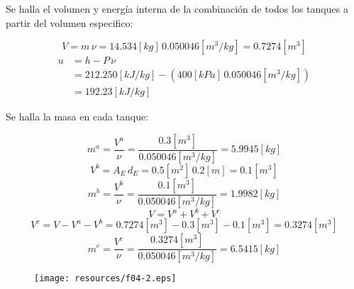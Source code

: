 \documentclass[letter,11pt]{article}
\begin{document}
\begin{enumerate}
Se halla el volumen y energía interna de la combinación de todos los tanques
a partir del volumen especifico:

\begin{equation*}
    V = m\,\nu = 14.534[kg]\,0.050046[m^3/kg] = 0.7274[m^3]
\end{equation*}
\begin{equation*}
    \begin{split}
        u &= h - P\,\nu \\
          &= 212.250[kJ/kg] - (400[kPa]\,0.050046[m^3/kg]) \\
          &= 192.23[kJ/kg]
    \end{split}
\end{equation*}

Se halla la masa en cada tanque:

\begin{equation*}
    m^a = \frac{V^a}{\nu} = \frac{0.3[m^3]}{0.050046[m^3/kg]} = 5.9945[kg]
\end{equation*}
\begin{equation*}
    V^b = A_E\,d_E = 0.5[m^2]\,0.2[m] = 0.1[m^3]
\end{equation*}
\begin{equation*}
    m^b = \frac{V^b}{\nu} = \frac{0.1[m^3]}{0.050046[m^3/kg]} = 1.9982[kg]
\end{equation*}
\begin{equation*}
    V = V^a + V^b + V^c
\end{equation*}
\begin{equation*}
    V^c = V - V^a - V^b = 0.7274[m^3] - 0.3[m^3] - 0.1[m^3] = 0.3274[m^3]
\end{equation*}
\begin{equation*}
    m^c = \frac{V^c}{\nu} = \frac{0.3274[m^3]}{0.050046[m^3/kg]} = 6.5415[kg]
\end{equation*}

\begin{figure}[H]
\centering
\texttt{[image: resources/f04-2.eps]}
\end{figure}


\end{enumerate}
\end{document}
